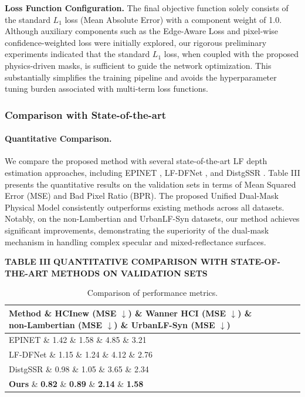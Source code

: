\documentclass[lettersize,journal]{IEEEtran}
\begin{document}
{\textbf{Loss Function Configuration.} The final objective function solely consists of the standard $L_1$ loss (Mean Absolute Error) with a component weight of 1.0. Although auxiliary components such as the Edge-Aware Loss and pixel-wise confidence-weighted loss were initially explored, our rigorous preliminary experiments indicated that the standard $L_1$ loss, when coupled with the proposed physics-driven masks, is sufficient to guide the network optimization. This substantially simplifies the training pipeline and avoids the hyperparameter tuning burden associated with multi-term loss functions.

\subsubsection{Comparison with State-of-the-art}

\paragraph{Quantitative Comparison.}
We compare the proposed method with several state-of-the-art LF depth estimation approaches, including EPINET , LF-DFNet , and DistgSSR . Table III presents the quantitative results on the validation sets in terms of Mean Squared Error (MSE) and Bad Pixel Ratio (BPR). The proposed Unified Dual-Mask Physical Model consistently outperforms existing methods across all datasets. Notably, on the non-Lambertian and UrbanLF-Syn datasets, our method achieves significant improvements, demonstrating the superiority of the dual-mask mechanism in handling complex specular and mixed-reflectance surfaces.

\textbf{TABLE III}
\textbf{QUANTITATIVE COMPARISON WITH STATE-OF-THE-ART METHODS ON VALIDATION SETS}

\begin{table}[!t]
\caption{Comparison of performance metrics.}
\label{tab:comparison}
\centering
\begin{tabular*}{\linewidth}{@{\extracolsep{\fill}}lllll}
\toprule
Method \& HCInew (MSE $\downarrow$) \& Wanner HCI (MSE $\downarrow$) \& non-Lambertian (MSE $\downarrow$) \& UrbanLF-Syn (MSE $\downarrow$) \\
\midrule
EPINET  \& 1.42 \& 1.58 \& 4.85 \& 3.21 \\
LF-DFNet  \& 1.15 \& 1.24 \& 4.12 \& 2.76 \\
DistgSSR  \& 0.98 \& 1.05 \& 3.65 \& 2.34 \\
\textbf{Ours} \& \textbf{0.82} \& \textbf{0.89} \& \textbf{2.14} \& \textbf{1.58} \\
\bottomrule
\end{tabular*}
\end{table}
}
\end{document}
